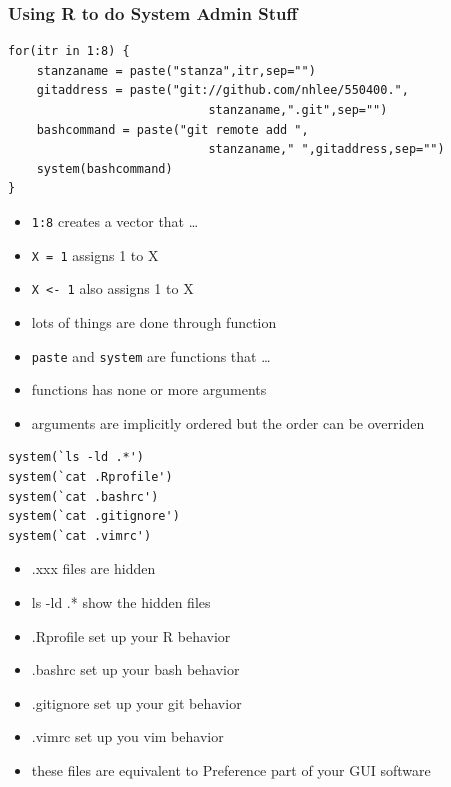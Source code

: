 \documentclass[hyperref={colorlinks=false},handout,10pt]{beamer}
\let\olditem\item
\renewcommand{\item}{\setlength{\itemsep}{0.5\baselineskip}\olditem}
\begin{document}
\begin{frame}
    \frametitle{Using R to do System Admin Stuff}
    \begin{lstlisting}
for(itr in 1:8) {
    stanzaname = paste("stanza",itr,sep="")
    gitaddress = paste("git://github.com/nhlee/550400.",
                            stanzaname,".git",sep="")
    bashcommand = paste("git remote add ",
                            stanzaname," ",gitaddress,sep="")
    system(bashcommand)
}
    \end{lstlisting}
    \begin{itemize}
        \item \texttt{1:8} creates a vector that \ldots 
        \item \texttt{X = 1} assigns 1 to X 
        \item \texttt{X <- 1} also assigns 1 to X
        \item lots of things are done through function 
        \item \texttt{paste} and \texttt{system} are functions that \ldots 
        \item functions has none or more arguments 
        \item arguments are implicitly ordered but the order can be overriden
    \end{itemize}
    \begin{lstlisting}
system(`ls -ld .*')
system(`cat .Rprofile')
system(`cat .bashrc')
system(`cat .gitignore')
system(`cat .vimrc')
    \end{lstlisting}
    \begin{itemize}
        \item .xxx files are hidden
        \item ls -ld .* show the hidden files
        \item .Rprofile set up your R behavior
        \item .bashrc set up your bash behavior
        \item .gitignore set up your git behavior 
        \item .vimrc set up you vim behavior
        \item these files are equivalent to Preference part of your GUI
            software
    \end{itemize}
\end{frame}
\end{document}
